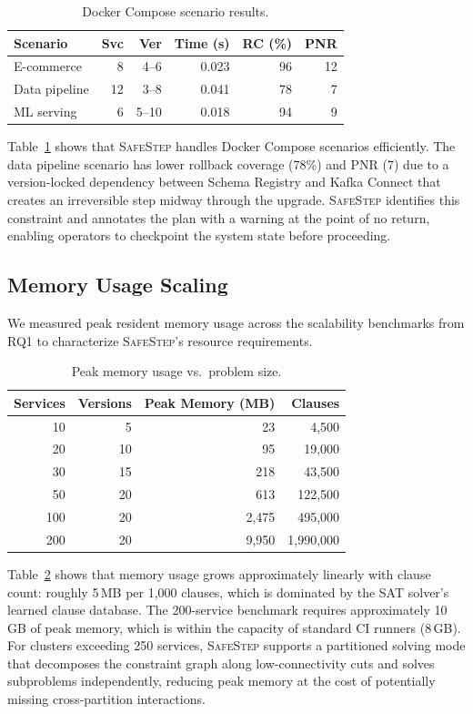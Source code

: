 \documentclass[10pt,twocolumn]{article}
\newcommand{\safestep}{\textsc{SafeStep}}
\begin{document}
\begin{table}[t]
\centering
\caption{Docker Compose scenario results.}
\label{tab:compose}
\small
\begin{tabular}{@{}lrrrrr@{}}
\toprule
Scenario & Svc & Ver & Time (s) & RC (\%) & PNR \\
\midrule
E-commerce   & 8  & 4--6  & 0.023 & 96 & 12 \\
Data pipeline & 12 & 3--8  & 0.041 & 78  & 7 \\
ML serving   & 6  & 5--10 & 0.018 & 94 & 9 \\
\bottomrule
\end{tabular}
\end{table}

Table~\ref{tab:compose} shows that \safestep{} handles Docker
Compose scenarios efficiently. The data pipeline scenario has
lower rollback coverage (78\%) and PNR (7) due to a
version-locked dependency between Schema Registry and Kafka
Connect that creates an irreversible step midway through the
upgrade. \safestep{} identifies this constraint and
annotates the plan with a warning at the point of no return,
enabling operators to checkpoint the system state before
proceeding.

\subsection{Memory Usage Scaling}

We measured peak resident memory usage across the scalability
benchmarks from RQ1 to characterize \safestep{}'s resource
requirements.

\begin{table}[t]
\centering
\caption{Peak memory usage vs.\ problem size.}
\label{tab:memory}
\small
\begin{tabular}{@{}rrrr@{}}
\toprule
Services & Versions & Peak Memory (MB) & Clauses \\
\midrule
10  & 5  & 23   & 4,500 \\
20  & 10 & 95   & 19,000 \\
30  & 15 & 218  & 43,500 \\
50  & 20 & 613  & 122,500 \\
100 & 20 & 2,475 & 495,000 \\
200 & 20 & 9,950 & 1,990,000 \\
\bottomrule
\end{tabular}
\end{table}

Table~\ref{tab:memory} shows that memory usage grows
approximately linearly with clause count: roughly 5\,MB per
1,000 clauses, which is dominated by the SAT solver's learned
clause database. The 200-service benchmark requires
approximately 10\,GB of peak memory, which is within the
capacity of standard CI runners (8\,GB). For clusters exceeding
250 services, \safestep{} supports a partitioned solving mode
that decomposes the constraint graph along low-connectivity cuts
and solves subproblems independently, reducing peak memory at
the cost of potentially missing cross-partition interactions.
\end{document}
